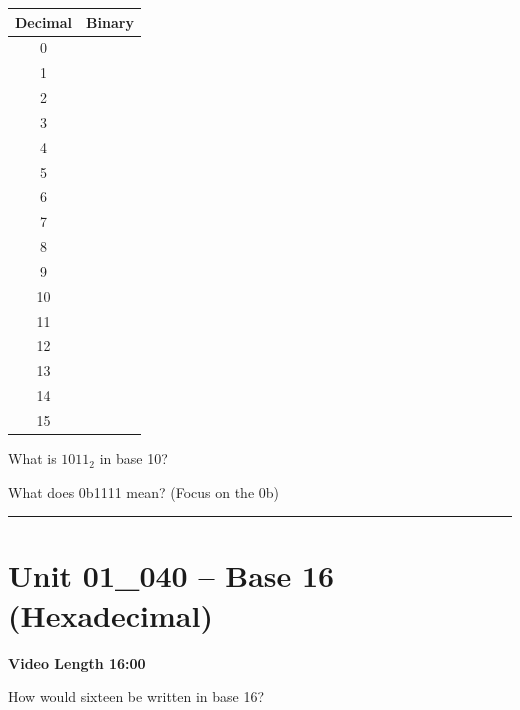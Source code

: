 \documentclass[letterpaper,12pt]{exam}
\newcommand{\unit}{Unit 01}
\begin{document}
\begin{questions}
\begin{samepage}
\begin{huge}
\begin{tabular}{| c | c |}
 \hline
    Decimal& Binary \\
    \hline
 0 &  \hspace{30mm}\\
 \hline 
 1 &  \\
 \hline 
 2 &  \\
 \hline 
 3 &  \\
 \hline 
 4 &  \\
 \hline 
 5  &  \\
 \hline 
 6 &  \\
 \hline 
 7 &  \\
 \hline 
 8  &  \\
 \hline 
 9 &  \\
 \hline 
 10 &  \\
 \hline 
 11 &  \\
 \hline 
 12 &  \\
 \hline 
 13 &  \\
 \hline 
 14  &  \\
 \hline 
 15 &  \\
 \hline 
 
\end{tabular}
\end{huge}

\end{samepage}
\par
 
\begin{samepage}
    \question What is $1011_2$ in base 10?
    \vspace{5mm}
\end{samepage}
\par
\begin{samepage}
    \question What does 0b1111 mean?  (Focus on the 0b)
    \vspace{5mm}
\end{samepage}
\par
 

\rule{0.5\textwidth}{.4pt} %

\section*{\unit\_040 -- Base 16 (Hexadecimal) }
\par{\selectfont\textbf{Video Length 16:00}}
\begin{samepage}
    \question How would sixteen be written in base 16?
    \vspace{5mm}
\end{samepage}


\end{questions}
\end{document}
